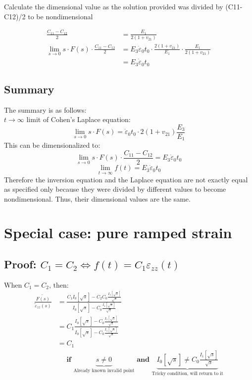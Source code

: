 \documentclass{article}
\begin{document}
Calculate the dimensional value as the solution provided was divided by (C11-C12)/2 to be nondimensional

\begin{align}
\frac{C_{11}-C_{12}}{2}&=\frac{E_{1}}{2\left(1+v_{21}\right)} \\
\lim _{s \rightarrow 0} s \cdot F(s) \cdot \frac{C_{11}-C_{12}}{2}&=E_{3} \dot{\varepsilon}_{0} t_{0} \cdot \frac{2\left(1+v_{21}\right)}{E_{1}} \cdot \frac{E_{1}}{2\left(1+v_{21}\right)} \\ 
&=E_{3} \dot{\varepsilon}_{0} t_{0}
\end{align}


\subsection{Summary}
The summary is as follows: \\
$t \rightarrow \infty$ limit of Cohen's Laplace equation:
$$
\lim _{s \rightarrow 0} s \cdot F(s)=\dot{\varepsilon}_{0} t_{0} \cdot 2\left(1+v_{21}\right) \frac{E_{3}}{E_{1}}
$$
This can be dimensionalized to:
$$
\lim _{s \rightarrow 0} s \cdot F(s) \cdot \frac{C_{11}-C_{12}}{2}=E_{3} \dot{\varepsilon}_{0} t_{0}
$$
$$
\lim _{t \rightarrow \infty} f(t)=E_{3} \dot{\varepsilon}_{0} t_{0}
$$
Therefore the inversion equation and the Laplace equation are not exactly equal as specified only because they were divided by different values to become nondimensional. Thus, their dimensional values are the same.

\section{Special case: pure ramped strain}
\subsection{Proof: $C_1=C_2 \iff f(t)=C_1 \varepsilon_{zz}(t) $}

$\text{When $C_1=C_2$, then:}$
\begin{align}
\frac{\widetilde{F(s)}}{\tilde{\varepsilon}_{zz}(s)}
&=\frac{C_{1} I_{0}\left[\sqrt{s}\right]-C_{2} C_{0} \frac{I_{1}\left[\sqrt{s}\right]}{\sqrt{s}}}{I_{0}\left[\sqrt{s}\right]-C_{0} \frac{I_{1}\left[\sqrt{s}\right]}{\sqrt{s}}}  \\
&= C_{1} \frac{I_{0}\left[\sqrt{s}\right]-C_{0} \frac{I_{1}\left[\sqrt{s}\right]}{\sqrt{s}}}{I_{0}\left[\sqrt{s}\right]-C_{0} \frac{I_{1}\left[\sqrt{s}\right]}{\sqrt{s}}}  \\
&= C_1 \\
&\quad \textbf{ if } \underbrace{s\neq0}_{\text{Already known } \text{invalid point}} \textbf{ and }
\underbrace{I_{0}\left[\sqrt{s}\right] \neq C_{0} \frac{I_{1}\left[\sqrt{s}\right]}{\sqrt{s}}}_{\text{Tricky condition, } \text{will return to it}}
\end{align}
\end{document}
